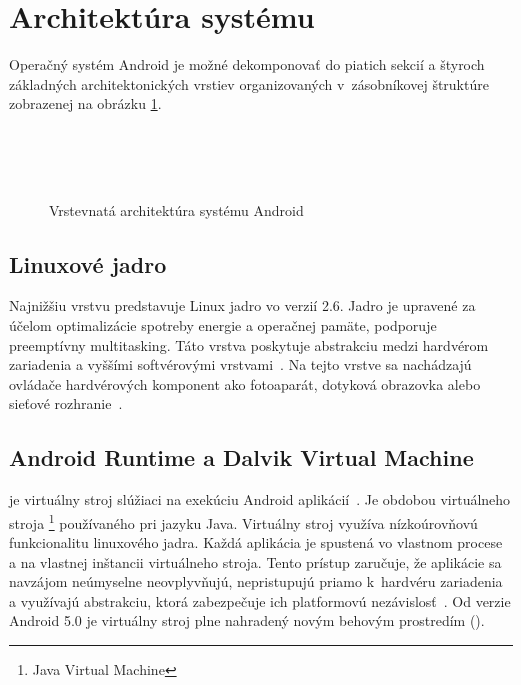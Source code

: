 \section{Architektúra systému}
Operačný systém Android je možné dekomponovať do piatich sekcií a štyroch základných architektonických vrstiev organizovaných v~zásobníkovej štruktúre~\cite{Gunasekera2012} zobrazenej na obrázku \ref{fig:struktura}.
\begin{figure} [htb]
 \centering
	\\
	\\
	\\
  \caption{Vrstevnatá architektúra systému Android}
  \label{fig:struktura}
\end{figure}
\subsection{Linuxové jadro}
Najnižšiu vrstvu predstavuje Linux jadro vo verzií 2.6. Jadro je upravené za účelom optimalizácie spotreby energie a operačnej pamäte, podporuje preemptívny multitasking. Táto vrstva poskytuje abstrakciu medzi hardvérom zariadenia a vyššími softvérovými vrstvami~\cite{Allen2010}. Na tejto vrstve sa nachádzajú ovládače hardvérových komponent ako fotoaparát, dotyková obrazovka alebo sieťové rozhranie~\cite{architecture}.
\subsection{Android Runtime a Dalvik Virtual Machine}
 je virtuálny stroj slúžiaci na exekúciu Android aplikácií~\cite{dalvik}. Je obdobou virtuálneho stroja \footnote{Java Virtual Machine} používaného pri jazyku Java. Virtuálny stroj  využíva nízkoúrovňovú funkcionalitu linuxového jadra. Každá aplikácia je spustená vo vlastnom procese a na vlastnej inštancii virtuálneho stroja. Tento prístup zaručuje, že aplikácie sa navzájom neúmyselne neovplyvňujú, nepristupujú priamo k~hardvéru zariadenia a využívajú abstrakciu, ktorá zabezpečuje ich platformovú nezávislosť~\cite{architecture}.  Od verzie Android 5.0 je virtuálny stroj  plne nahradený novým behovým prostredím  ().
